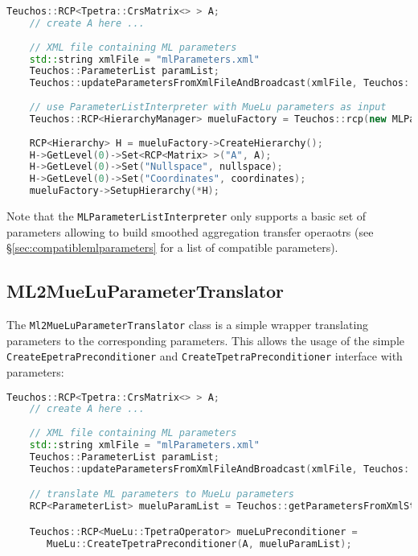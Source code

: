 \begin{lstlisting}[language=C++]
    Teuchos::RCP<Tpetra::CrsMatrix<> > A;
    // create A here ...
    
    // XML file containing ML parameters
    std::string xmlFile = "mlParameters.xml"
    Teuchos::ParameterList paramList;
    Teuchos::updateParametersFromXmlFileAndBroadcast(xmlFile, Teuchos::Ptr<Teuchos::ParameterList>(&paramList), *comm);
       
    // use ParameterListInterpreter with MueLu parameters as input
    Teuchos::RCP<HierarchyManager> mueluFactory = Teuchos::rcp(new MLParameterListInterpreter(*paramList));
    
    RCP<Hierarchy> H = mueluFactory->CreateHierarchy();
    H->GetLevel(0)->Set<RCP<Matrix> >("A", A);
    H->GetLevel(0)->Set("Nullspace", nullspace);
    H->GetLevel(0)->Set("Coordinates", coordinates);
    mueluFactory->SetupHierarchy(*H);
\end{lstlisting}

Note that the \texttt{MLParameterListInterpreter} only supports a basic set of \ml parameters allowing to build smoothed aggregation transfer operaotrs (see \S\ref{sec:compatiblemlparameters} for a list of compatible \ml parameters).

\subsection{ML2MueLuParameterTranslator}

The \texttt{Ml2MueLuParameterTranslator} class is a simple wrapper translating \ml parameters to the corresponding \muelu parameters. This allows the usage of the simple \texttt{CreateEpetraPreconditioner} and \texttt{CreateTpetraPreconditioner} interface with \ml parameters:

\begin{lstlisting}[language=C++]
    Teuchos::RCP<Tpetra::CrsMatrix<> > A;
    // create A here ...
    
    // XML file containing ML parameters
    std::string xmlFile = "mlParameters.xml"
    Teuchos::ParameterList paramList;
    Teuchos::updateParametersFromXmlFileAndBroadcast(xmlFile, Teuchos::Ptr<Teuchos::ParameterList>(&paramList), *comm);

    // translate ML parameters to MueLu parameters
    RCP<ParameterList> mueluParamList = Teuchos::getParametersFromXmlString(MueLu::ML2MueLuParameterTranslator::translate(paramList,"SA"));

    Teuchos::RCP<MueLu::TpetraOperator> mueLuPreconditioner =
       MueLu::CreateTpetraPreconditioner(A, mueluParamList);
\end{lstlisting}

